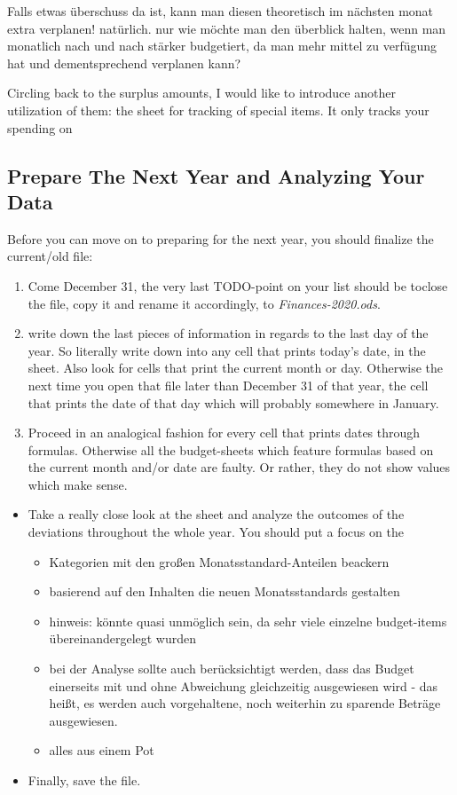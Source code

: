 Falls etwas überschuss da ist, kann man diesen theoretisch im nächsten monat extra verplanen! natürlich. nur wie möchte man den überblick halten, wenn man monatlich nach und nach stärker budgetiert, da man mehr mittel zu verfügung hat und dementsprechend verplanen kann?

Circling back to the surplus amounts, I would like to introduce another utilization of them: the sheet for tracking of special items.
It only tracks your spending on 



\subsection{Prepare The Next Year and Analyzing Your Data}
\label{subsec:prepare-the-next-year-analysis}

Before you can move on to preparing \tfn for the next year, you should finalize the current/old file:
\begin{enumerate}
	\item Come December 31, the very last TODO-point on your list should be toclose the file, copy it and rename it accordingly, \eg to \emph{Finances-2020.ods}.
	\item  write down the last pieces of information in regards to the last day of the year.
	So literally write down  into any cell that prints today's date, \eg in the  sheet.
	Also look for cells that print the current month or day.
	Otherwise the next time you open that file later than December 31 of that year, the cell that prints the date of that day which will probably somewhere in January.
	\item Proceed in an analogical fashion for every cell that prints dates through formulas.
	Otherwise all the budget-sheets which feature formulas based on the current month and/or date are faulty.
	Or rather, they do not show values which make sense.
\end{enumerate}

\begin{itemize}
	\item Take a really close look at the  sheet and analyze the outcomes of the deviations throughout the whole year.
	You should put a focus on the 
	\begin{itemize}
		\item Kategorien mit den großen Monatsstandard-Anteilen beackern
		\item basierend auf den Inhalten die neuen Monatsstandards gestalten
		\item hinweis: könnte quasi unmöglich sein, da sehr viele einzelne budget-items übereinandergelegt wurden
		\item bei der Analyse sollte auch berücksichtigt werden, dass das Budget einerseits mit und ohne Abweichung gleichzeitig ausgewiesen wird - das heißt, es werden auch vorgehaltene, noch weiterhin zu sparende Beträge ausgewiesen.
		\item alles aus einem Pot
	\end{itemize}	
	\item Finally, save the file.	
\end{itemize}

